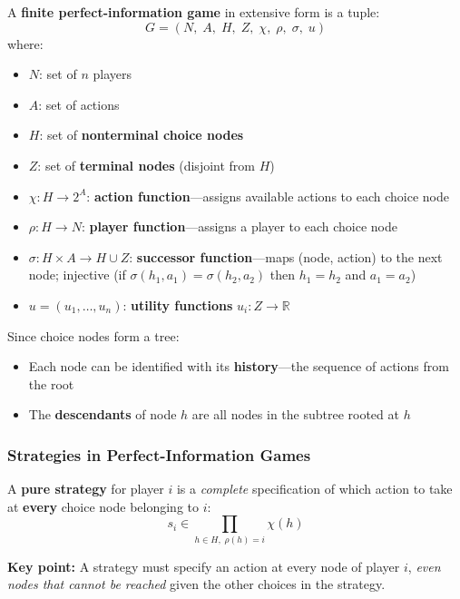 \begin{defbox}
A \textbf{finite perfect-information game} in extensive form is a tuple:
\[
G = (N,\; A,\; H,\; Z,\; \chi,\; \rho,\; \sigma,\; u)
\]
where:
\begin{itemize}
  \item $N$: set of $n$ players
  \item $A$: set of actions
  \item $H$: set of \textbf{nonterminal choice nodes}
  \item $Z$: set of \textbf{terminal nodes} (disjoint from $H$)
  \item $\chi: H \to 2^A$: \textbf{action function}---assigns available actions to each choice node
  \item $\rho: H \to N$: \textbf{player function}---assigns a player to each choice node
  \item $\sigma: H \times A \to H \cup Z$: \textbf{successor function}---maps (node, action) to the next node; injective (if $\sigma(h_1, a_1) = \sigma(h_2, a_2)$ then $h_1 = h_2$ and $a_1 = a_2$)
  \item $u = (u_1, \ldots, u_n)$: \textbf{utility functions} $u_i: Z \to \mathbb{R}$
\end{itemize}
\end{defbox}

\begin{tipbox}
Since choice nodes form a tree:
\begin{itemize}
  \item Each node can be identified with its \textbf{history}---the sequence of actions from the root
  \item The \textbf{descendants} of node $h$ are all nodes in the subtree rooted at $h$
\end{itemize}
\end{tipbox}

\separator

\subsubsection{Strategies in Perfect-Information Games}

\begin{defbox}
A \textbf{pure strategy} for player $i$ is a \textit{complete} specification of which action to take at \textbf{every} choice node belonging to $i$:
\[
s_i \in \prod_{h \in H,\; \rho(h) = i} \chi(h)
\]

\textbf{Key point:} A strategy must specify an action at every node of player $i$, \textit{even nodes that cannot be reached} given the other choices in the strategy.
\end{defbox}

